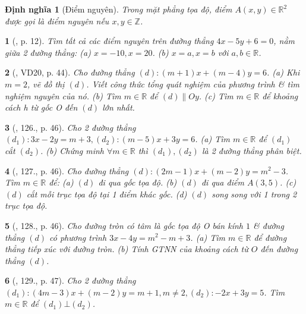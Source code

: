 \documentclass{article}
\newtheorem{baitoan}{}
\newtheorem{dinhnghia}{Định nghĩa}
\begin{document}
\begin{dinhnghia}[Điểm nguyên]
	Trong mặt phẳng tọa độ, điểm $A(x,y)\in\mathbb{R}^2$ được gọi là {\rm điểm nguyên} nếu $x,y\in\mathbb{Z}$.
\end{dinhnghia}

\begin{baitoan}[\cite{Binh_boi_duong_Toan_9_tap_2}, p. 12]
	Tìm tất cả các điểm nguyên trên đường thẳng $4x - 5y + 6 = 0$, nằm giữa 2 đường thẳng: (a) $x = -10,x = 20$. (b) $x = a,x = b$ với $a,b\in\mathbb{R}$.
\end{baitoan}

\begin{baitoan}[\cite{Tuyen_Toan_9_old}, VD20, p. 44]
	Cho đường thẳng $(d):(m + 1)x + (m - 4)y = 6$. (a) Khi $m = 2$, vẽ đồ thị $(d)$. Viết công thức tổng quát nghiệm của phương trình \& tìm nghiệm nguyên của nó. (b) Tìm $m\in\mathbb{R}$ để $(d)\parallel Oy$. (c) Tìm $m\in\mathbb{R}$ để khoảng cách h từ gốc O đến $(d)$ lớn nhất.
\end{baitoan}

\begin{baitoan}[\cite{Tuyen_Toan_9_old}, 126., p. 46]
	Cho 2 đường thẳng $(d_1):3x - 2y = m + 3,(d_2):(m - 5)x + 3y = 6$. (a) Tìm $m\in\mathbb{R}$ để $(d_1)$ cắt $(d_2)$. (b) Chứng minh $\forall m\in\mathbb{R}$ thì $(d_1),(d_2)$ là 2 đường thẳng phân biệt.
\end{baitoan}

\begin{baitoan}[\cite{Tuyen_Toan_9_old}, 127., p. 46]
	Cho đường thẳng $(d):(2m - 1)x + (m - 2)y = m^2 - 3$. Tìm $m\in\mathbb{R}$ để: (a) $(d)$ đi qua gốc tọa độ. (b) $(d)$ đi qua điểm $A(3,5)$. (c) $(d)$ cắt mỗi trục tọa độ tại 1 điểm khác gốc. (d) $(d)$ song song với 1 trong 2 trục tọa độ.
\end{baitoan}

\begin{baitoan}[\cite{Tuyen_Toan_9_old}, 128., p. 46]
	Cho đường tròn có tâm là gốc tọa độ O bán kính $1$ \& đường thẳng $(d)$ có phương trình $3x - 4y = m^2 - m + 3$. (a) Tìm $m\in\mathbb{R}$ để đường thẳng tiếp xúc với đường tròn. (b) Tính {\rm GTNN} của khoảng cách từ $O$ đến đường thẳng $(d)$.
\end{baitoan}

\begin{baitoan}[\cite{Tuyen_Toan_9_old}, 129., p. 47]
	Cho 2 đường thẳng $(d_1):(4m - 3)x + (m - 2)y = m + 1,m\ne 2,(d_2):-2x + 3y = 5$. Tìm $m\in\mathbb{R}$ để $(d_1)\bot(d_2)$.
\end{baitoan}
\end{document}
